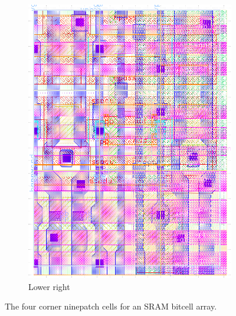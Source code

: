 \begin{figure}[H]
\begin{subfigure}[b]{0.22\textwidth}
\end{subfigure}
\hfill
\begin{subfigure}[b]{0.22\textwidth} \centering
\includegraphics[width=\textwidth]{figures/bitcell_lr.png}
\caption{Lower right}
\end{subfigure}

\caption{The four corner ninepatch cells for an SRAM bitcell array. \label{fig:bitcell-ninepatch-corner-tiles}}
\end{figure}


